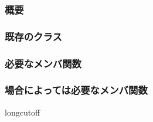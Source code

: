 \subsubsection{概要}

\subsubsection{既存のクラス}

\subsubsection{必要なメンバ関数}

\subsubsection{場合によっては必要なメンバ関数}



longcutoff




